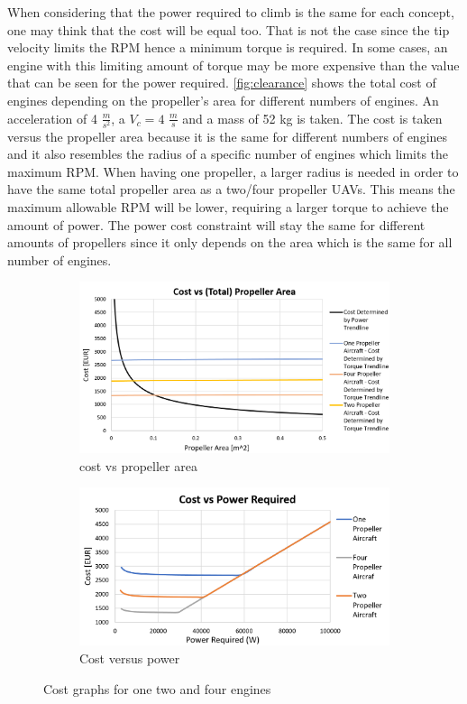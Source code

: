 When considering that the power required to climb is the same for each concept, one may think that the cost will be equal too. That is not the case since the tip velocity limits the RPM hence a minimum torque is required. In some cases, an engine with this limiting amount of torque may be more expensive than the value that can be seen for the power required. \autoref{fig:clearance} shows the total cost of engines depending on the propeller's area for different numbers of engines. An acceleration of 4 $\frac{m}{s^2}$, a $V_c = 4$ $\frac{m}{s}$ and a mass of 52 kg is taken. The cost is taken versus the propeller area because it is the same for different numbers of engines and it also resembles the radius of a specific number of engines which limits the maximum RPM. When having one propeller, a larger radius is needed in order to have the same total propeller area as a two/four propeller UAVs. This means the maximum allowable RPM will be lower, requiring a larger torque to achieve the amount of power. The power cost constraint will stay the same for different amounts of propellers since it only depends on the area which is the same for all number of engines.


\begin{figure}[htb]
    \centering
    \begin{subfigure}[b]{0.53\textwidth}
        \includegraphics[width=\textwidth]{CostAnalysis/Figures/costvsarea2.PNG}
        \caption{cost vs propeller area}
        \label{fig:clearance}
    \end{subfigure}
    \begin{subfigure}[b]{0.45\textwidth}
        \includegraphics[width=\textwidth]{CostAnalysis/Figures/costvspower3.PNG}
        \caption{Cost versus power}
        \label{fig:costvspower}
    \end{subfigure}
    \caption{Cost graphs for one two and four engines}
\end{figure}


